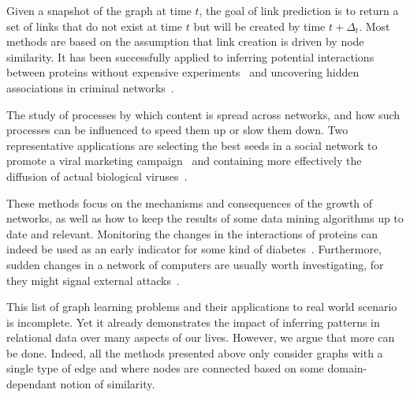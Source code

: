 \begin{description}[leftmargin=*]
  \item[link prediction~\autocite{linkPredSurvey16}] Given a snapshot of the graph at time $t$, the
    goal of link prediction is to return a set of links that do not exist at time $t$ but will be
    created by time $t+\Delta_t$. Most methods are based on the assumption that link creation is
    driven by node similarity. It has been successfully applied to inferring potential interactions
    between proteins without expensive experiments~\autocite{linkPredBio06} and uncovering hidden
    associations in criminal networks~\autocite{linkPredCrime08}.

  \item[information and influence propagation~\autocite{infmax13}] The study of processes by which
    content is spread across networks, and how such processes can be influenced to speed them up or
    slow them down. Two representative applications are selecting the best seeds in a social network
    to promote a viral marketing campaign~\autocite{infmaxKempe15} and containing more effectively
    the diffusion of actual biological viruses~\autocite{influenceBio13}.

  \item[network evolution~\autocite{networkEvolution14}] These methods focus on the mechanisms and
    consequences of the growth of networks, as well as how to keep the results of some data mining
    algorithms up to date and relevant. Monitoring the changes in the interactions of proteins
    can indeed be used as an early indicator for some kind of diabetes~\autocite{evolBio10}.
    Furthermore, sudden changes in a network of computers are usually worth investigating, for they
    might signal external attacks~\autocite{evolSecurity04}.

\end{description}

This list of graph learning problems and their applications to real world scenario is incomplete.
Yet it already demonstrates the impact of inferring patterns in relational data over many aspects of
our lives. However, we argue that more can be done. Indeed, all the methods presented above only
consider graphs with a single type of edge and where nodes are connected based on some
domain-dependant notion of similarity.

